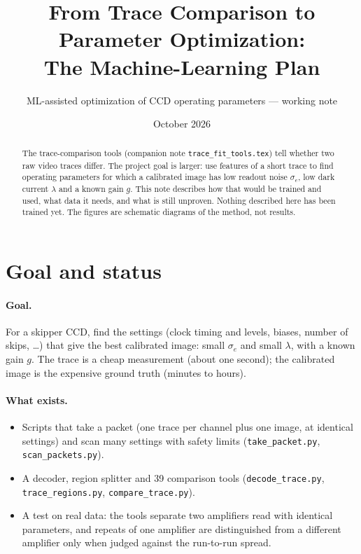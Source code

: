 \documentclass[11pt]{article}
\title{From Trace Comparison to Parameter Optimization:\\The Machine-Learning Plan}
\author{ML-assisted optimization of CCD operating parameters --- working note}
\date{October 2026}
\newcommand{\code}[1]{\texttt{#1}}
\begin{document}
\maketitle

\begin{abstract}
The trace-comparison tools (companion note \code{trace\_fit\_tools.tex}) tell whether two raw video traces differ.
The project goal is larger: use features of a short trace to find operating parameters for which a calibrated
image has low readout noise $\sigma_e$, low dark current $\lambda$ and a known gain $g$. This note describes how that
would be trained and used, what data it needs, and what is still unproven. Nothing described here has been trained yet.
The figures are schematic diagrams of the method, not results.
\end{abstract}

\section{Goal and status}

\paragraph{Goal.} For a skipper CCD, find the settings (clock timing and levels, biases, number of skips, \ldots) that give the
best calibrated image: small $\sigma_e$ and small $\lambda$, with a known gain $g$. The trace is a cheap measurement
(about one second); the calibrated image is the expensive ground truth (minutes to hours).

\paragraph{What exists.}
\begin{itemize}
  \item Scripts that take a packet (one trace per channel plus one image, at identical settings) and scan many settings
        with safety limits (\code{take\_packet.py}, \code{scan\_packets.py}).
  \item A decoder, region splitter and 39 comparison tools (\code{decode\_trace.py}, \code{trace\_regions.py}, \code{compare\_trace.py}).
  \item A test on real data: the tools separate two amplifiers read with identical parameters, and repeats of one amplifier are
        distinguished from a different amplifier only when judged against the run-to-run spread.
\end{itemize}
\end{document}
